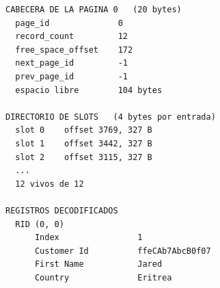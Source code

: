 \documentclass[a4paper,12pt]{article}
\begin{document}
\begin{lstlisting}[caption={Salida del inspector sobre la primera página}]
CABECERA DE LA PAGINA 0   (20 bytes)
  page_id              0
  record_count         12
  free_space_offset    172
  next_page_id         -1
  prev_page_id         -1
  espacio libre        104 bytes

DIRECTORIO DE SLOTS   (4 bytes por entrada)
  slot 0    offset 3769, 327 B
  slot 1    offset 3442, 327 B
  slot 2    offset 3115, 327 B
  ...
  12 vivos de 12

REGISTROS DECODIFICADOS
  RID (0, 0)
      Index                1
      Customer Id          ffeCAb7AbcB0f07
      First Name           Jared
      Country              Eritrea
\end{lstlisting}
\end{document}
